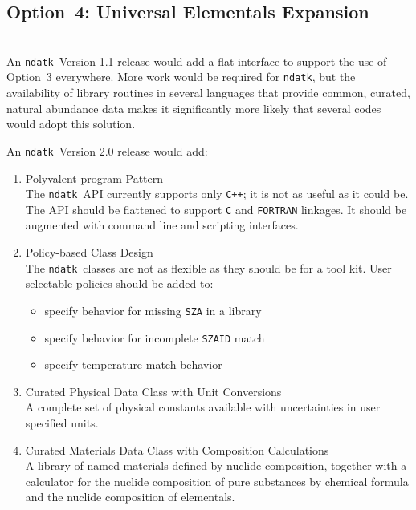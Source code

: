 \documentclass[12pt]{lamemo}
\newcommand{\ndatk}{\texttt{ndatk}}
\begin{document}
\subsection{Option~4: Universal Elementals Expansion}\mbox{}\\

An \ndatk\ Version 1.1 release would add a flat interface to support
the use of Option~3 everywhere.  More work would be required for
\ndatk, but the availability of library routines in several languages
that provide common, curated, natural abundance data makes it
significantly more likely that several codes would adopt this
solution.

An \ndatk\ Version 2.0 release would add:
\begin{enumerate}
\item Polyvalent-program Pattern\cite[p. 281]{raymond03}\\
  The \ndatk\ API currently supports only \texttt{C++}; it is not as
  useful as it could be.  The API should be flattened to support
  \texttt{C} and \texttt{FORTRAN} linkages.  It should be augmented
  with command line and scripting interfaces.

\item Policy-based Class Design\cite[Ch. 1]{alexandrescu01}\\
  The \ndatk\ classes are not as flexible as they should be for a tool
  kit.  User selectable policies should be added to:
  \begin{itemize}
  \item specify behavior for missing \texttt{SZA} in a library
  \item specify behavior for incomplete \texttt{SZAID} match
  \item{specify temperature match behavior}
  \end{itemize}

\item Curated Physical Data Class with Unit Conversions\\
  A complete set of physical constants available with uncertainties in
  user specified units.
  
\item Curated Materials Data Class with Composition Calculations\\ A
  library of named materials defined by nuclide composition, together
  with a calculator for the nuclide composition of pure substances by
  chemical formula and the nuclide composition of elementals.

\end{enumerate}
\end{document}
